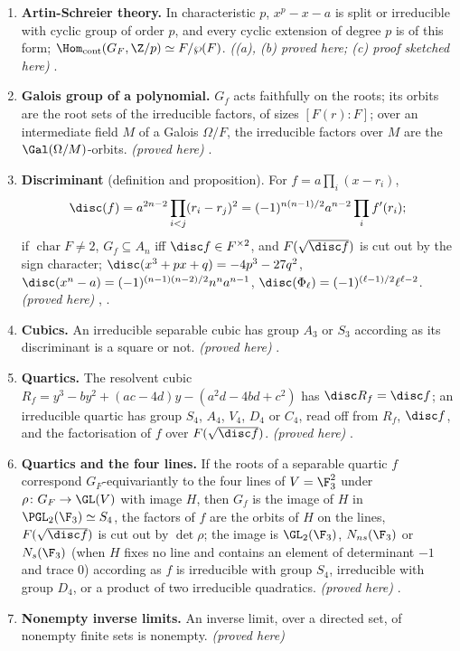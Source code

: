 \begin{enumerate}[label=\textbf{\thechapter.\arabic*}]
\item \textbf{Artin-Schreier theory.} In characteristic $p$, $x^p-x-a$ is split or irreducible with cyclic group of order $p$, and every cyclic
extension of degree $p$ is of this form; $\Hom_{\mathrm{cont}}(G_F,\Z/p)\simeq F/\wp(F)$. \emph{((a), (b) proved here; (c) proof sketched here)}
.
\item \textbf{Galois group of a polynomial.} $G_f$ acts faithfully on the roots; its orbits are the root sets of the irreducible factors, of sizes
$[F(r):F]$; over an intermediate field $M$ of a Galois $\Omega/F$, the irreducible factors over $M$ are the $\Gal(\Omega/M)$-orbits. \emph{(proved here)}
.
\item \textbf{Discriminant} (definition and proposition). For $f=a\prod_i(x-r_i)$,
\[
\disc(f)=a^{2n-2}\prod_{i<j}(r_i-r_j)^2=(-1)^{n(n-1)/2}a^{n-2}\prod_if'(r_i);
\]
if
$\operatorname{char}F\ne2$, $G_f\subseteq A_n$ iff $\disc f\in F^{\times2}$, and $F(\sqrt{\disc f})$ is cut out by the sign character; $\disc(x^3+px+q)=
-4p^3-27q^2$, $\disc(x^n-a)=(-1)^{(n-1)(n-2)/2}n^na^{n-1}$, $\disc(\Phi_\ell)=(-1)^{(\ell-1)/2}\ell^{\ell-2}$. \emph{(proved here)}
, .
\item \textbf{Cubics.} An irreducible separable cubic has group $A_3$ or $S_3$ according as its discriminant is a square or not. \emph{(proved here)}
.
\item \textbf{Quartics.} The resolvent cubic $R_f=y^3-by^2+(ac-4d)y-(a^2d-4bd+c^2)$ has $\disc R_f=\disc f$; an irreducible quartic has group $S_4$,
$A_4$, $V_4$, $D_4$ or $C_4$, read off from $R_f$, $\disc f$, and the factorisation of $f$ over $F(\sqrt{\disc f})$. \emph{(proved here)} .
\item \textbf{Quartics and the four lines.} If the roots of a separable quartic $f$ correspond $G_F$-equivariantly to the four lines of $V=\F_3^2$ under
$\rho\colon G_F\to\GL(V)$ with image $H$, then $G_f$ is the image of $H$ in $\PGL_2(\F_3)\simeq S_4$, the factors of $f$ are the orbits of $H$ on the lines,
$F(\sqrt{\disc f})$ is cut out by $\det\rho$; the image is $\GL_2(\F_3)$, $N_{ns}(\F_3)$ or $N_s(\F_3)$ (when $H$ fixes no line and contains an element of
determinant $-1$ and trace $0$) according as $f$ is irreducible with group $S_4$, irreducible with group $D_4$, or a product of two irreducible quadratics.
\emph{(proved here)} .
\item \textbf{Nonempty inverse limits.} An inverse limit, over a directed set, of nonempty finite sets is nonempty. \emph{(proved here)}

\end{enumerate}
